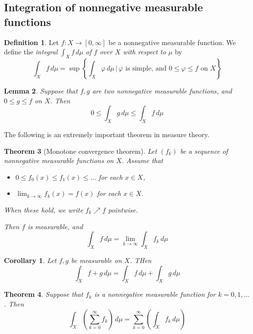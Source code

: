 \documentclass[10pt, oneside, reqno]{amsart}
\theoremstyle{plain}%
\newtheorem{thm}{Theorem}[section]
\newtheorem{lem}[thm]{Lemma}
\newtheorem*{cor}{Corollary}
\theoremstyle{definition}
\newtheorem{defn}[thm]{Definition}
\theoremstyle{remark}
\newcommand{\given}{ \, | \,}
\newcommand{\dmu}{\, d \mu}
\renewcommand{\phi}{\varphi}
\begin{document}
\subsection{Integration of nonnegative measurable functions} %
\label{sub:integration_of_nonnegative_measurable_functions}



\begin{defn}Let $f: X \rightarrow [0, \infty]$ be a nonnegative measurable function.  We define the \emph{integral $\int_X f \dmu$ of $f$ over $X$ with respect to $\mu$} by \[
    \int_X f \dmu = \sup \left\{ \int_X \phi \dmu \given \phi \text{ is simple, and } 0 \leq \phi \leq f \text{ on } X \right\}
    \]
\end{defn}

\begin{lem}
    Suppose that $f,g$ are two nonnegative measurable functions, and $0 \leq g \leq f$
 on $X$.  Then \[
    0 \leq \int_X g \dmu \leq \int_X f \dmu
 \]\end{lem}

The following is an extremely important theorem in measure theory. 
\begin{thm}[Monotone convergence theorem]
    Let $(f_k)$ be a sequence of nonnegative measurable functions on $X$.  Assume that \begin{itemize}
        \item $ 0 \leq f_0(x) \leq f_1(x) \leq \dots$ for each $x \in X$,
        \item $\lim_{k \rightarrow \infty} f_k(x) = f(x)$ for each $x \in X$.
    \end{itemize}
    When these hold, we write $f_k \nearrow f$ pointwise.  
    
    Then $f$ is measurable, and \[
        \int_X f \dmu = \lim_{ k \rightarrow \infty} \int_X f_k \dmu
    \] 
\end{thm}

\begin{cor}
    Let $f,g$ be measurable on $X$.  THen \[
        \int_X f + g \dmu = \int_X f \dmu + \int_X g \dmu
    \]
\end{cor}

\begin{thm}
    Suppose that $f_k$ is a nonnegative measurable function for $k = 0,1,\dots$.  Then \[
        \int_X \left(\sum_{k=0}^\infty f_k \right) \dmu = \sum_{k=0}^\infty \left( \int_X f_k \dmu \right)
    \]
\end{thm}
\end{document}
